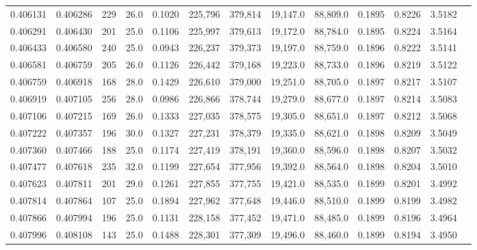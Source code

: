 \begin{tabular}{rrrrrrrrrrrrr}
0.406131 & 0.406286 &   229 & 26.0 &                                     0.1020 & 225,796 & 379,814 &  19,147.0 &  88,809.0 & 0.1895 & 0.8226 & 3.5182 \\
0.406291 & 0.406430 &   201 & 25.0 &                                     0.1106 & 225,997 & 379,613 &  19,172.0 &  88,784.0 & 0.1895 & 0.8224 & 3.5164 \\
0.406433 & 0.406580 &   240 & 25.0 &                                     0.0943 & 226,237 & 379,373 &  19,197.0 &  88,759.0 & 0.1896 & 0.8222 & 3.5141 \\
0.406581 & 0.406759 &   205 & 26.0 &                                     0.1126 & 226,442 & 379,168 &  19,223.0 &  88,733.0 & 0.1896 & 0.8219 & 3.5122 \\
0.406759 & 0.406918 &   168 & 28.0 &                                     0.1429 & 226,610 & 379,000 &  19,251.0 &  88,705.0 & 0.1897 & 0.8217 & 3.5107 \\
0.406919 & 0.407105 &   256 & 28.0 &                                     0.0986 & 226,866 & 378,744 &  19,279.0 &  88,677.0 & 0.1897 & 0.8214 & 3.5083 \\
0.407106 & 0.407215 &   169 & 26.0 &                                     0.1333 & 227,035 & 378,575 &  19,305.0 &  88,651.0 & 0.1897 & 0.8212 & 3.5068 \\
0.407222 & 0.407357 &   196 & 30.0 &                                     0.1327 & 227,231 & 378,379 &  19,335.0 &  88,621.0 & 0.1898 & 0.8209 & 3.5049 \\
0.407360 & 0.407466 &   188 & 25.0 &                                     0.1174 & 227,419 & 378,191 &  19,360.0 &  88,596.0 & 0.1898 & 0.8207 & 3.5032 \\
0.407477 & 0.407618 &   235 & 32.0 &                                     0.1199 & 227,654 & 377,956 &  19,392.0 &  88,564.0 & 0.1898 & 0.8204 & 3.5010 \\
0.407623 & 0.407811 &   201 & 29.0 &                                     0.1261 & 227,855 & 377,755 &  19,421.0 &  88,535.0 & 0.1899 & 0.8201 & 3.4992 \\
0.407814 & 0.407864 &   107 & 25.0 &                                     0.1894 & 227,962 & 377,648 &  19,446.0 &  88,510.0 & 0.1899 & 0.8199 & 3.4982 \\
0.407866 & 0.407994 &   196 & 25.0 &                                     0.1131 & 228,158 & 377,452 &  19,471.0 &  88,485.0 & 0.1899 & 0.8196 & 3.4964 \\
0.407996 & 0.408108 &   143 & 25.0 &                                     0.1488 & 228,301 & 377,309 &  19,496.0 &  88,460.0 & 0.1899 & 0.8194 & 3.4950 \\

\end{tabular}
